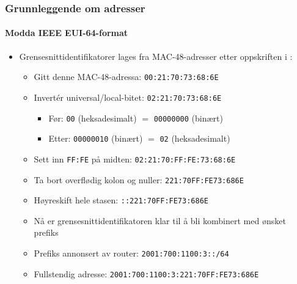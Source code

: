 \begin{frame}%
  \frametitle{Grunnleggende om adresser}
  \framesubtitle{Modda IEEE EUI-64-format}
  \begin{itemize}%
  \item Grensesnittidentifikatorer lages fra MAC-48-adresser etter
    oppskriften i :
    \begin{itemize}%
    \item Gitt denne MAC-48-adressa: \texttt{00:21:70:73:68:6E}
    \item Invertér universal/local-bitet: \texttt{0\alert{2}:21:70:73:68:6E}
      \begin{itemize}%
      \item Før: \texttt{0\alert{0}} (heksadesimalt) \({}={}\) \texttt{000000\alert{0}0} (binært)
      \item Etter: \texttt{000000\alert{1}0} (binært) \({}={}\) \texttt{0\alert{2}} (heksadesimalt)
      \end{itemize}
    \item Sett inn \texttt{FF:FE} på midten: \texttt{02:21:70:\alert{FF:FE}:73:68:6E}
    \item Ta bort overflødig kolon og nuller: \texttt{221:70FF:FE73:686E}
    \item Høyreskift hele stasen: \texttt{::221:70FF:FE73:686E}
    \item Nå er grensesnittidentifikatoren klar til å bli kombinert med ønsket prefiks
    \item Prefiks annonsert av router: \texttt{2001:700:1100:3::/64}
    \item Fullstendig adresse: \texttt{2001:700:1100:3:221:70FF:FE73:686E}
    \end{itemize}
  \end{itemize}
\end{frame}

